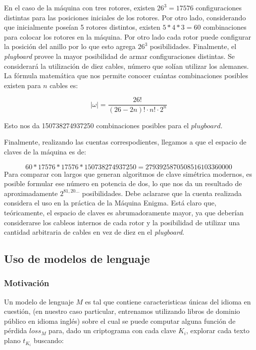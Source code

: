 \documentclass[a4paper,10pt]{article}
\begin{document}
En el caso de la máquina con tres rotores, existen $26^3=17576$ configuraciones distintas para las posiciones iniciales de los rotores. Por otro lado, considerando que inicialmente poseían 5 rotores distintos, existen $5*4*3=60$ combinaciones para colocar los rotores en la máquina. Por otro lado cada rotor puede configurar la posición del anillo por lo que esto agrega $26^3$ posibilidades. Finalmente, el \textit{plugboard} provee la mayor posibilidad de armar configuraciones distintas. Se considerará la utilización de diez cables, número que solían utilizar los alemanes. La fórmula matemática que nos permite conocer cuántas combinaciones posibles existen para $n$ cables es:

\begin{equation}
    |\omega| = \frac{26!}{(26 - 2n)! \cdot n! \cdot 2^n}
\end{equation}

Esto nos da 150738274937250 combinaciones posibles para el $plugboard$.

Finalmente, realizando las cuentas correspodientes, llegamos a que el espacio de claves de la máquina es de: 

\begin{equation}
    60*17576*17576*150738274937250 = 2793925870508516103360000
\end{equation}
Para comparar con largos que generan algoritmos de clave simétrica modernos, es posible formular ese número en potencia de dos, lo que nos da un resultado de aproximadamente $2^{81,20\ldots}$ posibilidades. Debe aclararse que la cuenta realizada considera el uso en la práctica de la Máquina Enigma. Está claro que, teóricamente, el espacio de claves es abrumadoramente mayor, ya que deberían considerarse los cableos internos de cada rotor y la posibilidad de utilizar una cantidad arbitraria de cables en vez de diez en el \textit{plugboard}.

\subsection{Uso de modelos de lenguaje}

\subsubsection{Motivación}

Un modelo de lenguaje $M$ es tal que contiene caracteristicas únicas del idioma en cuestión, (en nuestro caso particular, entrenamos utilizando libros de dominio público en idioma inglés) sobre el cual se puede computar alguna función de pérdida $loss_M$ para, dado un criptograma con cada clave $K_i$, explorar cada texto plano $t_{K_i}$ buscando:
\end{document}
